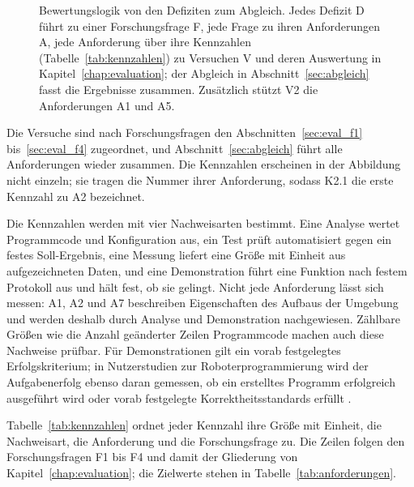 \begin{figure}[htbp]
  \centering
  
  \caption[Bewertungslogik von den Defiziten zum Abgleich]{Bewertungslogik von den Defiziten zum Abgleich. Jedes Defizit D führt zu einer Forschungsfrage F, jede Frage zu ihren Anforderungen A, jede Anforderung über ihre Kennzahlen (Tabelle~\ref{tab:kennzahlen}) zu Versuchen V und deren Auswertung in Kapitel~\ref{chap:evaluation}; der Abgleich in Abschnitt~\ref{sec:abgleich} fasst die Ergebnisse zusammen. Zusätzlich stützt V2 die Anforderungen A1 und A5.}
  \label{fig:bewertungslogik}
\end{figure}

Die Versuche sind nach Forschungsfragen den Abschnitten~\ref{sec:eval_f1} bis~\ref{sec:eval_f4} zugeordnet, und Abschnitt~\ref{sec:abgleich} führt alle Anforderungen wieder zusammen.
Die Kennzahlen erscheinen in der Abbildung nicht einzeln; sie tragen die Nummer ihrer Anforderung, sodass K2.1 die erste Kennzahl zu A2 bezeichnet.

Die Kennzahlen werden mit vier Nachweisarten bestimmt.
Eine Analyse wertet Programmcode und Konfiguration aus, ein Test prüft automatisiert gegen ein festes Soll-Ergebnis, eine Messung liefert eine Größe mit Einheit aus aufgezeichneten Daten, und eine Demonstration führt eine Funktion nach festem Protokoll aus und hält fest, ob sie gelingt.
Nicht jede Anforderung lässt sich messen: A1, A2 und A7 beschreiben Eigenschaften des Aufbaus der Umgebung und werden deshalb durch Analyse und Demonstration nachgewiesen.
Zählbare Größen wie die Anzahl geänderter Zeilen Programmcode machen auch diese Nachweise prüfbar.
Für Demonstrationen gilt ein vorab festgelegtes Erfolgskriterium; in Nutzerstudien zur Roboterprogrammierung wird der Aufgabenerfolg ebenso daran gemessen, ob ein erstelltes Programm erfolgreich ausgeführt wird oder vorab festgelegte Korrektheitsstandards erfüllt \cite{Ajaykumar2021}.

Tabelle~\ref{tab:kennzahlen} ordnet jeder Kennzahl ihre Größe mit Einheit, die Nachweisart, die Anforderung und die Forschungsfrage zu.
Die Zeilen folgen den Forschungsfragen F1 bis F4 und damit der Gliederung von Kapitel~\ref{chap:evaluation}; die Zielwerte stehen in Tabelle~\ref{tab:anforderungen}.

